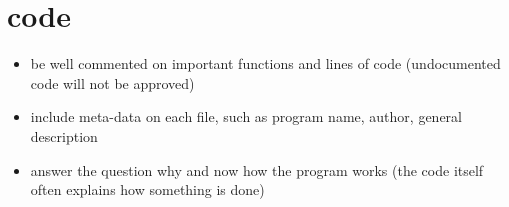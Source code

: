 \documentclass{article}
\begin{document}
\section{code}
\begin{itemize}
    \item be well commented on important functions and lines of code (undocumented code will not be approved)
    \item include meta-data on each file, such as program name, author, general description
    \item answer the question why and now how the program works (the code itself often explains how something is done)
\end{itemize}
\end{document}

